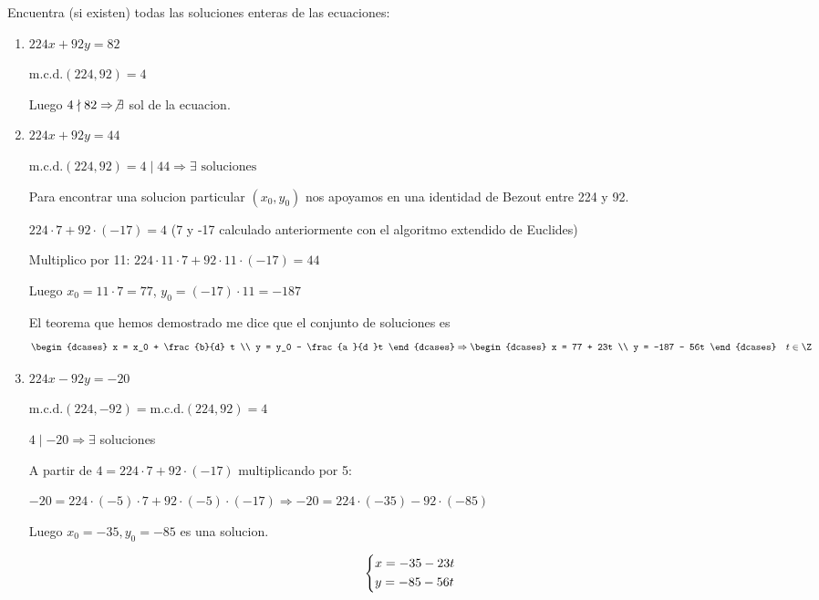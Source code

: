 \begin{example}
	Encuentra (si existen) todas las soluciones enteras de las ecuaciones:
	\begin{enumerate}
		\item \(224x + 92y = 82\)

		      \(\mathrm{m.c.d.}(224,92) = 4 \)

		      Luego \(4 \nmid 82 \Rightarrow \not\exists \) sol de la ecuacion.

		\item \(224x + 92y = 44\)

		      \(\mathrm{m.c.d.}(224,92) = 4 \mid 44 \Rightarrow \exists \text{ soluciones}  \)

		      Para encontrar una solucion particular \((x_0,y_0 )\) nos apoyamos en una identidad de Bezout entre 224 y 92.

		      \(224 \cdot 7 + 92 \cdot (-17) = 4 \) (7 y -17 calculado anteriormente con el algoritmo extendido de Euclides)

		      Multiplico por 11: \(224 \cdot 11 \cdot 7 + 92 \cdot 11 \cdot (-17) = 44 \)

		      Luego \(x_0 = 11 \cdot 7 = 77 \), \(y_0 = (-17) \cdot 11 = -187\)

		      El teorema que hemos demostrado me dice que el conjunto de soluciones es
		      \[
			      \begin{dcases}
				      x = x_0 + \frac{b}{d} t \\
				      y = y_0 - \frac{a }{d }t
			      \end{dcases} \Rightarrow
			      \begin{dcases}
				      x = 77 + 23t \\
				      y = -187 - 56t
			      \end{dcases} \quad t \in \Z
		      \]
		\item \(224x - 92y = -20 \)

		      \(\mathrm{m.c.d.}(224,-92) = \mathrm{m.c.d.}(224,92) = 4  \)

		      \(4 \mid -20 \Rightarrow \exists \) soluciones

		      A partir de \(4 = 224 \cdot 7 + 92 \cdot (-17)\) multiplicando por 5:

		      \(-20 = 224 \cdot (-5) \cdot 7 + 92 \cdot (-5) \cdot (-17) \Rightarrow -20 = 224 \cdot (-35) - 92 \cdot (-85)\)

		      Luego \(x_0 = -35, y_0 = -85 \) es una solucion.

		      \[
			      \begin{dcases}
				      x = -35 - 23t \\
				      y = -85 - 56t
			      \end{dcases}
		      \]
	\end{enumerate}
\end{example}

